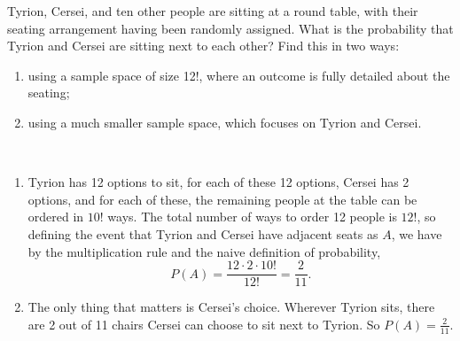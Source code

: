 
\setcounter{theorem}{19}

\begin{exercise}[BH.1.38]
	Tyrion, Cersei, and ten other people are sitting at a round table, with their seating arrangement having been randomly assigned. What is the probability that Tyrion and Cersei are sitting next to each other? Find this in two ways:
	\begin{enumerate}
		\item using a sample space of size 12!, where an outcome is fully detailed about the seating;
		\item using a much smaller sample space, which focuses on Tyrion and Cersei.
	\end{enumerate}
\begin{solution}~
	\begin{enumerate}
		\item Tyrion has 12 options to sit, for each of these 12 options, Cersei has 2 options, and for each of these, the remaining people at the table can be ordered in $10!$ ways. The total number of ways to order 12 people is $12!$, so defining the event that Tyrion and Cersei have adjacent seats as $A$, we have by the multiplication rule and the naive definition of probability,
			$$P(A) = \frac{12 \cdot 2\cdot 10!}{12!} = \frac{2}{11}.$$
		\item The only thing that matters is Cersei's choice. Wherever Tyrion sits, there are 2 out of 11 chairs Cersei can choose to sit next to Tyrion. So $P(A) = \frac{2}{11}$.
	\end{enumerate}
\end{solution}
\end{exercise}


